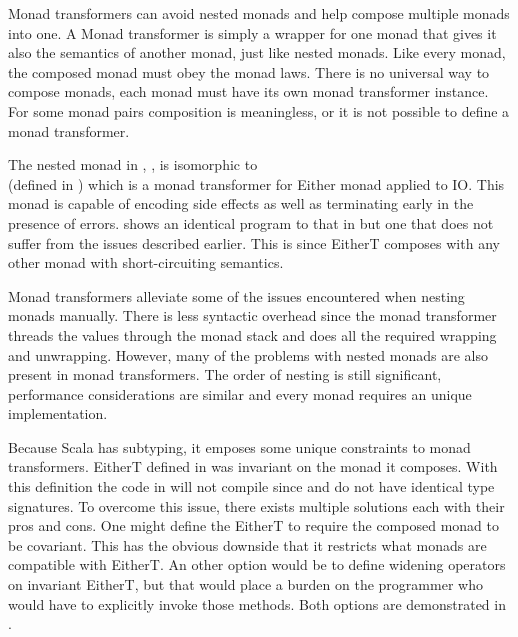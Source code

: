 


Monad transformers can avoid nested monads and help compose multiple monads into one. A Monad transformer is simply a wrapper for one monad that gives it also the semantics of another monad, just like nested monads. Like every monad, the composed monad must obey the monad laws. There is no universal way to compose monads, each monad must have its own monad transformer instance. For some monad pairs composition is meaningless, or it is not possible to define a monad transformer.

The nested monad in , , is isomorphic to \\ (defined in ) which is a monad transformer for Either monad applied to IO. This monad is capable of encoding side effects as well as terminating early in the presence of errors.  shows an identical program to that in  but one that does not suffer from the issues described earlier. This is since EitherT composes with any other monad with short-circuiting semantics.



Monad transformers alleviate some of the issues encountered when nesting monads manually. There is less syntactic overhead since the monad transformer threads the values through the monad stack and does all the required wrapping and unwrapping. However, many of the problems with nested monads are also present in monad transformers. The order of nesting is still significant, performance considerations are similar and every monad requires an unique implementation.

Because Scala has subtyping, it emposes some unique constraints to monad transformers. EitherT defined in  was invariant on the monad it composes. With this definition the code in  will not compile since  and  do not have identical type signatures. To overcome this issue, there exists multiple solutions each with their pros and cons. One might define the EitherT to require the composed monad to be covariant. This has the obvious downside that it restricts what monads are compatible with EitherT. An other option would be to define widening operators on invariant EitherT, but that would place a burden on the programmer who would have to explicitly invoke those methods. Both options are demonstrated in .

